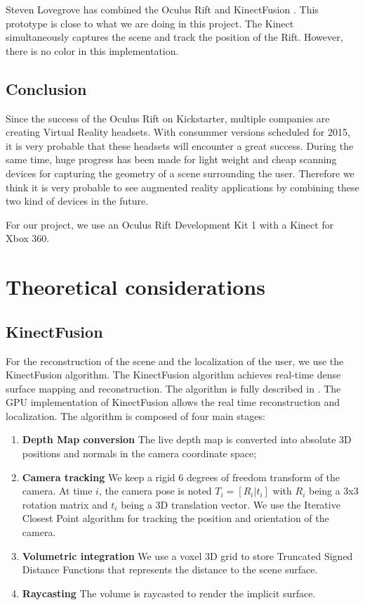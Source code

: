 \documentclass[12pt, twoside]{article}
\let\oldsection\section
\def\section{\cleardoublepage\oldsection}
\begin{document}
Steven Lovegrove has combined the Oculus Rift and KinectFusion \cite{OculusFusion}. This prototype is close to what we are doing in this project. The Kinect simultaneously captures the scene and track the position of the Rift. However, there is no color in this implementation.

\subsection{Conclusion}
Since the success of the Oculus Rift on Kickstarter, multiple companies are creating Virtual Reality headsets. With consummer versions scheduled for 2015, it is very probable that these headsets will encounter a great success. During the same time, huge progress has been made for light weight and cheap scanning devices for capturing the geometry of a scene surrounding the user. Therefore we think it is very probable to see augmented reality applications by combining these two kind of devices in the future.

For our project, we use an Oculus Rift Development Kit 1 with a Kinect for Xbox 360.

\newpage
\section{Theoretical considerations}
\subsection{KinectFusion}
For the reconstruction of the scene and the localization of the user, we use the KinectFusion algorithm. The KinectFusion algorithm achieves real-time dense surface mapping and reconstruction. The algorithm is fully described in \cite{KF1, KF2}. The GPU implementation of KinectFusion allows the real time reconstruction and localization. The algorithm is composed of four main stages:
\begin{enumerate}
\item \textbf{Depth Map conversion} The live depth map is converted into absolute 3D positions and normals in the camera coordinate space;
\item \textbf{Camera tracking} We keep a rigid 6 degrees of freedom transform of the camera. At time $i$, the camera pose is noted $T_i = [R_i|t_i]$ with $R_i$ being a 3x3 rotation matrix and $t_i$ being a 3D translation vector. We use the Iterative Closest Point algorithm for tracking the position and orientation of the camera.
\item \textbf{Volumetric integration} We use a voxel 3D grid to store Truncated Signed Distance Functions that represents the distance to the scene surface.
\item \textbf{Raycasting} The volume is raycasted to render the implicit surface.
\end{enumerate}
\end{document}
